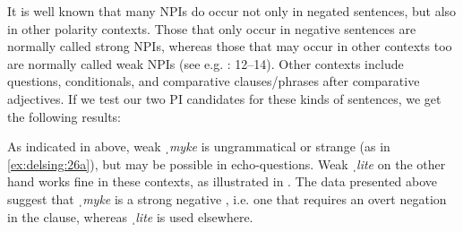 \documentclass[output=paper]{langscibook}
\begin{document}
It is well known that many NPIs do occur not only in negated sentences, but also in other polarity contexts. Those that only occur in negative sentences are normally called strong NPIs, whereas those that may occur in other contexts too are normally called weak NPIs (see e.g. \citealt{Brandtler2010}: 12–14). Other contexts include questions, conditionals, and comparative clauses/phrases after comparative adjectives. If we test our two PI candidates for these kinds of sentences, we get the following results:


\ea\label{ex:delsing:26}\judgewidth{\#}
\z
\ex\label{ex:delsing:27}
\z
\z


As indicated in  above, weak \textit{ˌmyke} is ungrammatical or strange (as in \ref{ex:delsing:26a}), but may be possible in echo-questions. Weak \textit{ˌlite} on the other hand works fine in these contexts, as illustrated in . The data presented above suggest that \textit{ˌmyke} is a strong negative , i.e. one that requires an overt negation in the clause, whereas \textit{ˌlite} is used elsewhere.
\end{document}
